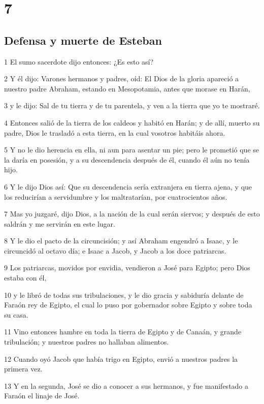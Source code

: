 \chapter{7}

\section*{Defensa y muerte de Esteban}

\par 1 El sumo sacerdote dijo entonces: ¿Es esto así?
\par 2 Y él dijo: Varones hermanos y padres, oíd: El Dios de la gloria apareció a nuestro padre Abraham, estando en Mesopotamia, antes que morase en Harán,
\par 3 y le dijo: Sal de tu tierra y de tu parentela, y ven a la tierra que yo te mostraré.
\par 4 Entonces salió de la tierra de los caldeos y habitó en Harán; y de allí, muerto su padre, Dios le trasladó a esta tierra, en la cual vosotros habitáis ahora.
\par 5 Y no le dio herencia en ella, ni aun para asentar un pie; pero le prometió que se la daría en posesión, y a su descendencia después de él, cuando él aún no tenía hijo.
\par 6 Y le dijo Dios así: Que su descendencia sería extranjera en tierra ajena, y que los reducirían a servidumbre y los maltratarían, por cuatrocientos años.
\par 7 Mas yo juzgaré, dijo Dios, a la nación de la cual serán siervos; y después de esto saldrán y me servirán en este lugar.
\par 8 Y le dio el pacto de la circuncisión; y así Abraham engendró a Isaac, y le circuncidó al octavo día; e Isaac a Jacob, y Jacob a los doce patriarcas.
\par 9 Los patriarcas, movidos por envidia, vendieron a José para Egipto; pero Dios estaba con él,
\par 10 y le libró de todas sus tribulaciones, y le dio gracia y sabiduría delante de Faraón rey de Egipto, el cual lo puso por gobernador sobre Egipto y sobre toda su casa.
\par 11 Vino entonces hambre en toda la tierra de Egipto y de Canaán, y grande tribulación; y nuestros padres no hallaban alimentos.
\par 12 Cuando oyó Jacob que había trigo en Egipto, envió a nuestros padres la primera vez.
\par 13 Y en la segunda, José se dio a conocer a sus hermanos, y fue manifestado a Faraón el linaje de José.
